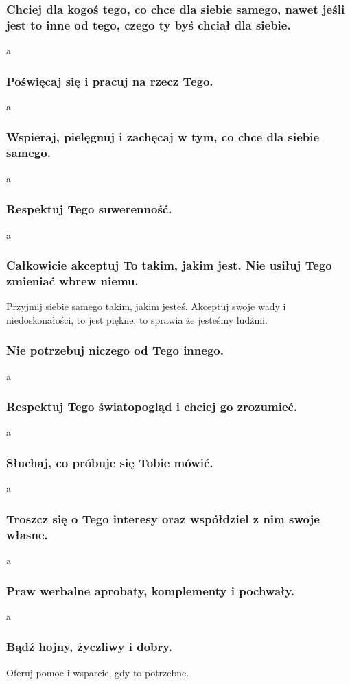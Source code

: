 \subsubsection{Chciej dla kogoś tego, co chce dla siebie samego, nawet jeśli jest to inne od tego, czego ty byś chciał dla siebie.}
a 
\subsubsection{Poświęcaj się i pracuj na rzecz Tego.}
a 
\subsubsection{Wspieraj, pielęgnuj i zachęcaj w tym, co chce dla siebie samego.}
a 
\subsubsection{Respektuj Tego suwerenność.}
a 
\subsubsection{Całkowicie akceptuj To takim, jakim jest. Nie usiłuj Tego zmieniać wbrew niemu.}
Przyjmij siebie samego takim, jakim jesteś.
Akceptuj swoje wady i niedoskonałości, to jest piękne, to sprawia że jesteśmy ludźmi.
\subsubsection{Nie potrzebuj niczego od Tego innego.}
a 
\subsubsection{Respektuj Tego światopogląd i chciej go zrozumieć.}
a
\subsubsection{Słuchaj, co próbuje się Tobie mówić.}
a 
\subsubsection{Troszcz się o Tego interesy oraz współdziel z nim swoje własne.}
a 
\subsubsection{Praw werbalne aprobaty, komplementy i pochwały.}
a 
\subsubsection{Bądź hojny, życzliwy i dobry.}
Oferuj pomoc i wsparcie, gdy to potrzebne.
